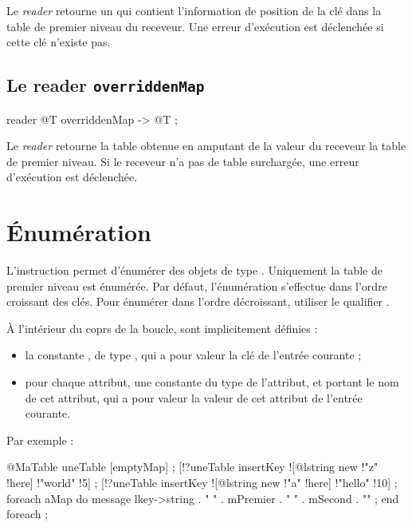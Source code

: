 Le \emph{reader}  retourne un  qui contient l'information de position de la clé  dans la table de premier niveau du receveur. Une erreur d'exécution est déclenchée si cette clé n'existe pas.








\subsection{Le reader \texttt{overriddenMap}}

\begin{galgascode}
reader @T overriddenMap -> @T ;
\end{galgascode}


Le \emph{reader}  retourne la table obtenue en amputant de la valeur du receveur la table de premier niveau. Si le receveur n'a pas de table surchargée, une erreur d'exécution est déclenchée.





\section{Énumération}

L'instruction  permet d'énumérer des objets de type . Uniquement la table de premier niveau est énumérée. Par défaut, l'énumération s'effectue dans l'ordre croissant des clés. Pour énumérer dans l'ordre décroissant, utiliser le qualifier \galgas{>}.

À l'intérieur du coprs de la boucle, sont implicitement définies :
\begin{itemize}
  \item la constante , de type , qui a pour valeur la clé de l'entrée courante ;
  \item pour chaque attribut, une constante du type de l'attribut, et portant le nom de cet attribut, qui a pour valeur la valeur de cet attribut de l'entrée courante.
\end{itemize}

Par exemple :
\begin{galgascode}
@MaTable uneTable [emptyMap] ;
[!?uneTable insertKey ![@lstring new !"z" !here] !"world" !5] ;
[!?uneTable insertKey ![@lstring new !"a" !here] !"hello" !10] ;
foreach aMap do
  message lkey->string . " " . mPremier . " " . mSecond . "\n" ;
end foreach ;
\end{galgascode}

